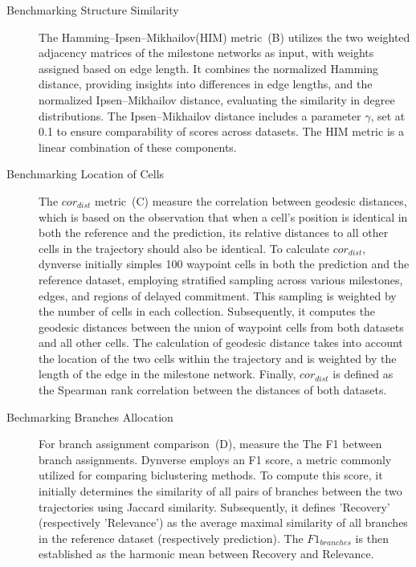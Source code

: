 \begin{description}
	\item[Benchmarking Structure Similarity]
	The Hamming–Ipsen–Mikhailov(HIM) metric~(B) utilizes the two weighted adjacency matrices of the milestone networks as input, with weights assigned based on edge length. It combines the normalized Hamming distance, providing insights into differences in edge lengths, and the normalized Ipsen–Mikhailov distance, evaluating the similarity in degree distributions. The Ipsen–Mikhailov distance includes a parameter $\gamma$, set at 0.1 to ensure comparability of scores across datasets. The HIM metric is a linear combination of these components.	

	\item[Benchmarking Location of Cells]
	The $cor_{dist}$ metric~(C) measure the correlation between geodesic distances, which is based on the observation that when a cell's position is identical in both the reference and the prediction, its relative distances to all other cells in the trajectory should also be identical. To calculate $cor_{dist}$, dynverse initially simples 100 waypoint cells in both the prediction and the reference dataset, employing stratified sampling across various milestones, edges, and regions of delayed commitment. This sampling is weighted by the number of cells in each collection. Subsequently, it computes the geodesic distances between the union of waypoint cells from both datasets and all other cells. The calculation of geodesic distance takes into account the location of the two cells within the trajectory and is weighted by the length of the edge in the milestone network. Finally, $cor_{dist}$ is defined as the Spearman rank correlation between the distances of both datasets.

	\item[Bechmarking Branches Allocation]
	For branch assignment comparison~(D), measure the The F1 between branch assignments. Dynverse employs an F1 score, a metric commonly utilized for comparing biclustering methods. To compute this score, it initially determines the similarity of all pairs of branches between the two trajectories using Jaccard similarity. Subsequently, it defines 'Recovery' (respectively 'Relevance') as the average maximal similarity of all branches in the reference dataset (respectively prediction). The $F1_{branches}$ is then established as the harmonic mean between Recovery and Relevance.


\end{description}
